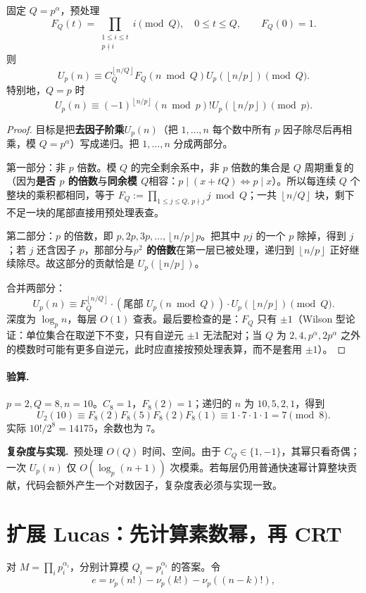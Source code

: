 \documentclass[UTF8,a4paper,11pt,twoside,openright,fontset=fandol]{ctexbook}
\theoremstyle{definition}
\newcommand{\floor}[1]{\left\lfloor #1\right\rfloor}
\newcommand{\cost}{\par\noindent\textbf{复杂度与实现.}\ }
\begin{document}
固定 $Q=p^\alpha$，预处理
\[
 F_Q(t)=\prod_{\substack{1\le i\le t\\p\nmid i}}i\pmod Q,\quad0\le t\le Q,\qquad F_Q(0)=1.
\]
则
\[
 U_p(n)\equiv C_Q^{\floor{n/Q}}F_Q(n\bmod Q)
 U_p(\floor{n/p})\pmod Q.
\]
特别地，$Q=p$ 时
\[
 U_p(n)\equiv(-1)^{\floor{n/p}}(n\bmod p)!
 U_p(\floor{n/p})\pmod p.
\]

\begin{proof}
目标是把\textbf{去因子阶乘}$U_p(n)$（把 $1,\ldots,n$ 每个数中所有 $p$ 因子除尽后再相乘，模 $Q=p^\alpha$）写成递归。把 $1,\ldots,n$ 分成两部分。

第一部分：非 $p$ 倍数。模 $Q$ 的完全剩余系中，非 $p$ 倍数的集合是 $Q$ 周期重复的（因为\textbf{是否 $p$ 的倍数}与\textbf{同余模 $Q$}相容：$p\mid(x+tQ)\iff p\mid x$）。所以每连续 $Q$ 个整块的乘积都相同，等于 $F_Q:=\prod_{1\le j\le Q,\,p\nmid j}j\bmod Q$；一共 $\floor{n/Q}$ 块，剩下不足一块的尾部直接用预处理表查。

第二部分：$p$ 的倍数，即 $p,2p,3p,\ldots,\floor{n/p}p$。把其中 $pj$ 的一个 $p$ 除掉，得到 $j$；若 $j$ 还含因子 $p$，那部分与\textbf{$p^2$ 的倍数}在第一层已被处理，递归到 $\floor{n/p}$ 正好继续除尽。故这部分的贡献恰是 $U_p(\floor{n/p})$。

合并两部分：
\[
 U_p(n)\equiv F_Q^{\floor{n/Q}}\cdot(\text{尾部 }U_p(n\bmod Q))\cdot U_p(\floor{n/p})\pmod Q .
\]
深度为 $\log_p n$，每层 $O(1)$ 查表。最后要检查的是：$F_Q$ 只有 $\pm1$（Wilson 型论证：单位集合在取逆下不变，只有自逆元 $\pm1$ 无法配对；当 $Q$ 为 $2,4,p^\alpha,2p^\alpha$ 之外的模数时可能有更多自逆元，此时应直接按预处理表算，而不是套用 $\pm1$）。
\end{proof}
\paragraph{验算.} $p=2,Q=8,n=10$。$C_8=1$，$F_8(2)=1$；递归的 $n$ 为 $10,5,2,1$，得到
\[
 U_2(10)\equiv F_8(2)F_8(5)F_8(2)F_8(1)
 \equiv1\cdot7\cdot1\cdot1=7\pmod8.
\]
实际 $10!/2^8=14175$，余数也为 $7$。
\cost 预处理 $O(Q)$ 时间、空间。由于 $C_Q\in\{1,-1\}$，其幂只看奇偶；一次 $U_p(n)$ 仅 $O(\log_p(n+1))$ 次模乘。若每层仍用普通快速幂计算整块贡献，代码会额外产生一个对数因子，复杂度表必须与实现一致。


\section{扩展 Lucas：先计算素数幂，再 CRT}
对 $M=\prod_i p_i^{\alpha_i}$，分别计算模 $Q_i=p_i^{\alpha_i}$ 的答案。令
\[
 e=\nu_p(n!)-\nu_p(k!)-\nu_p((n-k)!),
\]
\end{document}
